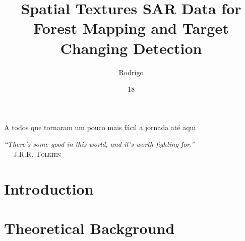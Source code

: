 \documentclass[msc, eng]{ita}    %
\author{Rodrigo}{Aragão Santos}
\title{Spatial Textures SAR Data for Forest Mapping and Target Changing Detection}
\date{18}{Novembro}{2021}
\begin{document}
\maketitle %

\begin{itadedication}
A todos que tornaram um pouco mais fácil a jornada até aqui
\end{itadedication}

\begin{itathanks}

\end{itathanks}

\thispagestyle{empty}
\ifhyperref{}\fi
\begin{flushright}
\begin{spacing}{1}
\mbox{}\vfill
{\sffamily\itshape
``There’s some good in this world, and it’s worth fighting for.''\\}
--- \textsc{J.R.R. Tolkien}
\end{spacing}
\end{flushright}

\begin{abstract}
\noindent

\end{abstract}

\begin{englishabstract}
\noindent

\end{englishabstract}

\listoffigures %


\listofabbreviations


\tableofcontents

\mainmatter

\chapter{Introduction}


\chapter{Theoretical Background}
\label{cap:bibliographic_review}

\end{document}
